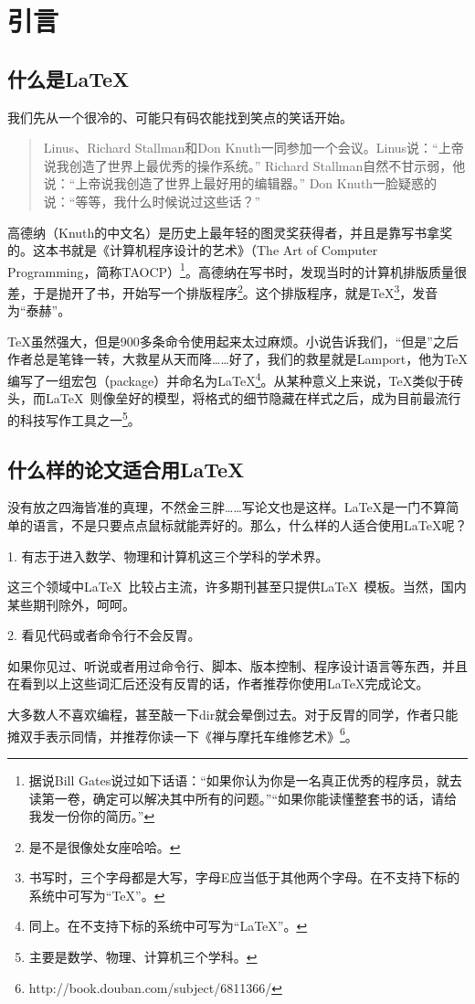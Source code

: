 
\chapter{引言}
\label{chap:introduction}

\section{什么是\LaTeX}

我们先从一个很冷的、可能只有码农能找到笑点的笑话开始。

\begin{quotation}
Linus、Richard Stallman和Don Knuth一同参加一个会议。Linus说：“上帝说我创造了世界上最优秀的操作系统。” Richard Stallman自然不甘示弱，他说：“上帝说我创造了世界上最好用的编辑器。” Don Knuth一脸疑惑的说：“等等，我什么时候说过这些话？”
\end{quotation}

高德纳（Knuth的中文名）是历史上最年轻的图灵奖获得者，并且是靠写书拿奖的。这本书就是《计算机程序设计的艺术》（The Art of Computer Programming，简称TAOCP）\footnote{据说Bill Gates说过如下话语：“如果你认为你是一名真正优秀的程序员，就去读第一卷，确定可以解决其中所有的问题。”“如果你能读懂整套书的话，请给我发一份你的简历。”}。高德纳在写书时，发现当时的计算机排版质量很差，于是抛开了书，开始写一个排版程序\footnote{是不是很像处女座哈哈。}。这个排版程序，就是\TeX\footnote{书写时，三个字母都是大写，字母E应当低于其他两个字母。在不支持下标的系统中可写为“TeX”。}，发音为“泰赫”。

\TeX 虽然强大，但是900多条命令使用起来太过麻烦。小说告诉我们，“但是”之后作者总是笔锋一转，大救星从天而降……好了，我们的救星就是Lamport，他为\TeX 编写了一组宏包（package）并命名为\LaTeX\footnote{同上。在不支持下标的系统中可写为“LaTeX”。}。从某种意义上来说，\TeX 类似于砖头，而\LaTeX~则像垒好的模型，将格式的细节隐藏在样式之后，成为目前最流行的科技写作工具之一\footnote{主要是数学、物理、计算机三个学科。}。

\section{什么样的论文适合用\LaTeX}

没有放之四海皆准的真理，不然金三胖……写论文也是这样。\LaTeX 是一门不算简单的语言，不是只要点点鼠标就能弄好的。那么，什么样的人适合使用\LaTeX 呢？

1. 有志于进入数学、物理和计算机这三个学科的学术界。

这三个领域中\LaTeX~比较占主流，许多期刊甚至只提供\LaTeX~模板。当然，国内某些期刊除外，呵呵。

2. 看见代码或者命令行不会反胃。

如果你见过、听说或者用过命令行、脚本、版本控制、程序设计语言等东西，并且在看到以上这些词汇后还没有反胃的话，作者推荐你使用\LaTeX 完成论文。

大多数人不喜欢编程，甚至敲一下dir就会晕倒过去。对于反胃的同学，作者只能摊双手表示同情，并推荐你读一下《禅与摩托车维修艺术》\footnote{http://book.douban.com/subject/6811366/}。